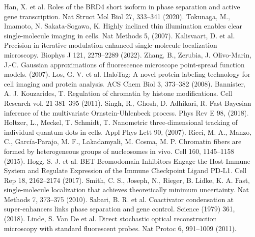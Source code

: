 \documentclass{ucetd}
\begin{document}
\newline
\noindent [14] Han, X. et al. Roles of the BRD4 short isoform in phase separation and active gene transcription. Nat Struct Mol Biol 27, 333–341 (2020). 
\newline
\noindent [15] Tokunaga, M., Imamoto, N. Sakata-Sogawa, K. Highly inclined thin illumination enables clear single-molecule imaging in cells. Nat Methods 5, (2007). 
\newline
\noindent [16] Kalisvaart, D. et al. Precision in iterative modulation enhanced single-molecule localization microscopy. Biophys J 121, 2279–2289 (2022). 
\newline
\noindent [17] Zhang, B., Zerubia, J. Olivo-Marin, J.-C. Gaussian approximations of fluorescence microscope point-spread function models. (2007). 
\newline
\noindent [18] Los, G. V. et al. HaloTag: A novel protein labeling technology for cell imaging and protein analysis. ACS Chem Biol 3, 373–382 (2008). 
\newline
\noindent [19] Bannister, A. J. Kouzarides, T. Regulation of chromatin by histone modifications. Cell Research vol. 21 381–395 (2011). 
\newline
\noindent [20] Singh, R., Ghosh, D. Adhikari, R. Fast Bayesian inference of the multivariate Ornstein-Uhlenbeck process. Phys Rev E 98, (2018). 
\newline
\noindent [21] Holtzer, L., Meckel, T. Schmidt, T. Nanometric three-dimensional tracking of individual quantum dots in cells. Appl Phys Lett 90, (2007). 
\newline
\noindent [22] Ricci, M. A., Manzo, C., García-Parajo, M. F., Lakadamyali, M. Cosma, M. P. Chromatin fibers are formed by heterogeneous groups of nucleosomes in vivo. Cell 160, 1145–1158 (2015). 
\newline
\noindent [23] Hogg, S. J. et al. BET-Bromodomain Inhibitors Engage the Host Immune System and Regulate Expression of the Immune Checkpoint Ligand PD-L1. Cell Rep 18, 2162–2174 (2017). 
\newline
\noindent [24] Smith, C. S., Joseph, N., Rieger, B. Lidke, K. A. Fast, single-molecule localization that achieves theoretically minimum uncertainty. Nat Methods 7, 373–375 (2010). 
\newline
\noindent [25] Sabari, B. R. et al. Coactivator condensation at super-enhancers links phase separation and gene control. Science (1979) 361, (2018). 
\newline
\noindent [26] Linde, S. Van De et al. Direct stochastic optical reconstruction microscopy with standard fluorescent probes. Nat Protoc 6, 991–1009 (2011). 
\end{document}
